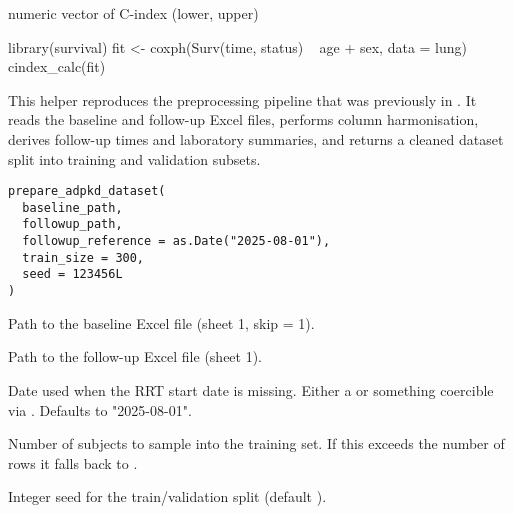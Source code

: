 \documentclass[letterpaper]{book}
\begin{document}
%
\begin{Value}
numeric vector of C-index (lower, upper)
\end{Value}
%
\begin{Examples}
\begin{ExampleCode}
library(survival)
fit <- coxph(Surv(time, status) ~ age + sex, data = lung)
cindex_calc(fit)



\end{ExampleCode}
\end{Examples}
%
\begin{Description}
This helper reproduces the preprocessing pipeline that was previously in
. It reads the baseline and follow-up Excel files, performs column
harmonisation, derives follow-up times and laboratory summaries, and returns a
cleaned dataset split into training and validation subsets.
\end{Description}
%
\begin{Usage}
\begin{verbatim}
prepare_adpkd_dataset(
  baseline_path,
  followup_path,
  followup_reference = as.Date("2025-08-01"),
  train_size = 300,
  seed = 123456L
)
\end{verbatim}
\end{Usage}
%
\begin{Arguments}
\begin{ldescription}
\item[\code{baseline\_path}] Path to the baseline Excel file (sheet 1, skip = 1).

\item[\code{followup\_path}] Path to the follow-up Excel file (sheet 1).

\item[\code{followup\_reference}] Date used when the RRT start date is missing. Either
a  or something coercible via . Defaults to
"2025-08-01".

\item[\code{train\_size}] Number of subjects to sample into the training set. If this
exceeds the number of rows it falls back to .

\item[\code{seed}] Integer seed for the train/validation split (default ).
\end{ldescription}
\end{Arguments}
\end{document}
